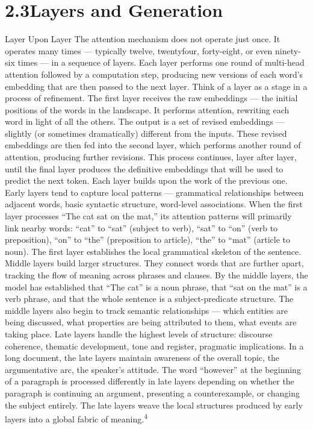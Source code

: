 \section{2.3\quad Layers and Generation}

Layer Upon Layer The attention mechanism does not operate just once. It operates many times — typically twelve, twentyfour, forty-eight, or even ninety-six times — in a sequence of layers. Each layer performs one round of multi-head attention followed by a computation step, producing new versions of each word’s embedding that are then passed to the next layer. Think of a layer as a stage in a process of refinement. The first layer receives the raw embeddings — the initial positions of the words in the landscape. It performs attention, rewriting each word in light of all the others. The output is a set of revised embeddings — slightly (or sometimes dramatically) different from the inputs. These revised embeddings are then fed into the second layer, which performs another round of attention, producing further revisions. This process continues, layer after layer, until the final layer produces the definitive embeddings that will be used to predict the next token. Each layer builds upon the work of the previous one. Early layers tend to capture local patterns — grammatical relationships between adjacent words, basic syntactic structure, word-level associations. When the first layer processes “The cat sat on the mat,” its attention patterns will primarily link nearby words: “cat” to “sat” (subject to verb), “sat” to “on” (verb to preposition), “on” to “the” (preposition to article), “the” to “mat” (article to noun). The first layer establishes the local grammatical skeleton of the sentence. Middle layers build larger structures. They connect words that are further apart, tracking the flow of meaning across phrases and clauses. By the middle layers, the model has established that “The cat” is a noun phrase, that “sat on the mat” is a verb phrase, and that the whole sentence is a subject-predicate structure. The middle layers also begin to track semantic relationships — which entities are being discussed, what properties are being attributed to them, what events are taking place. Late layers handle the highest levels of structure: discourse coherence, thematic development, tone and register, pragmatic implications. In a long document, the late layers maintain awareness of the overall topic, the argumentative arc, the speaker’s attitude. The word “however” at the beginning of a paragraph is processed differently in late layers depending on whether the paragraph is continuing an argument, presenting a counterexample, or changing the subject entirely. The late layers weave the local structures produced by early layers into a global fabric of meaning.\textsuperscript{4}

